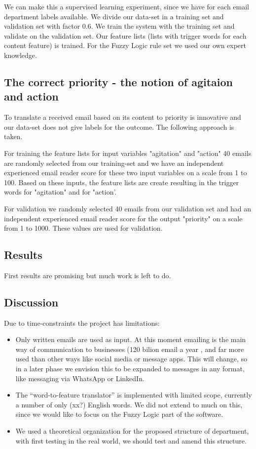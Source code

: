 \documentclass[journal]{IEEEtran}
\begin{document}
We can make this a supervised learning experiment, since we have for each email department labels available. We divide our data-set in a training set and validation set with factor 0.6. We train the system with the training set and validate on the validation set. Our feature lists (lists with trigger words for each content feature) is trained. For the Fuzzy Logic rule set we used our own expert knowledge.

\subsection{The correct priority - the notion of agitaion and action}

To translate a received email based on its content to priority is innovative and our data-set does not give labels for the outcome. The following approach is taken. 

For training the feature lists for input variables "agitation" and "action" 40 emails are randomly selected from our training-set and we have an independent experienced email reader score for these two input variables on a scale from 1 to 100. Based on these inputs, the feature lists are create resulting in the trigger words for "agitation" and for "action'. 

For validation we randomly selected 40 emails from our validation set and had an independent experienced email reader score for the output "priority" on a scale from 1 to 1000. These values are used for validation. 

\subsection{Results}

First results are promising but much work is left to do. 

\subsection{Discussion}
Due to time-constraints the project has limitations:
\begin{itemize}
    \item Only written emails are used as input. At this moment emailing is the main way of communication to businesses (120 bilion email a year \cite{email_statistics}, and far more used than other ways like social media or message apps. This will change, so in a later phase we envision this to be expanded to messages in any format, like messaging via WhatsApp or LinkedIn.
    \item The ``word-to-feature translator'' is implemented with limited scope, currently a number of only (xx?) English words. We did not extend to much on this, since we would like to focus on the Fuzzy Logic part of the software.
    \item We used a theoretical organization for the proposed structure of department, with first testing in the real world, we should test and amend this structure. %
\end{itemize}
\end{document}
